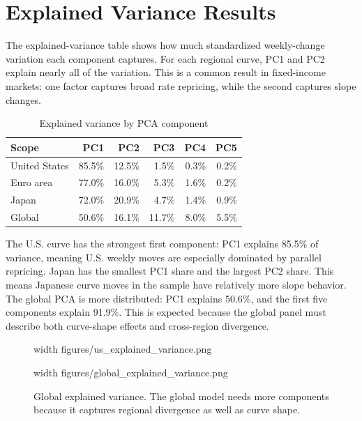 \documentclass[11pt]{article}
\newcommand{\img}[2]{\pdfximage width #1 {#2}\pdfrefximage\pdflastximage}
\begin{document}
\section{Explained Variance Results}

The explained-variance table shows how much standardized weekly-change variation each component captures. For each regional curve, PC1 and PC2 explain nearly all of the variation. This is a common result in fixed-income markets: one factor captures broad rate repricing, while the second captures slope changes.

\begin{table}[htbp]
\centering
\caption{Explained variance by PCA component}
\small
\begin{tabular}{lrrrrr}
\toprule
Scope & PC1 & PC2 & PC3 & PC4 & PC5 \\
\midrule
United States & 85.5\% & 12.5\% & 1.5\% & 0.3\% & 0.2\% \\
Euro area & 77.0\% & 16.0\% & 5.3\% & 1.6\% & 0.2\% \\
Japan & 72.0\% & 20.9\% & 4.7\% & 1.4\% & 0.9\% \\
Global & 50.6\% & 16.1\% & 11.7\% & 8.0\% & 5.5\% \\
\bottomrule
\end{tabular}
\end{table}

The U.S. curve has the strongest first component: PC1 explains 85.5\% of variance, meaning U.S. weekly moves are especially dominated by parallel repricing. Japan has the smallest PC1 share and the largest PC2 share. This means Japanese curve moves in the sample have relatively more slope behavior. The global PCA is more distributed: PC1 explains 50.6\%, and the first five components explain 91.9\%. This is expected because the global panel must describe both curve-shape effects and cross-region divergence.

\begin{figure}[htbp]
\centering
\begin{minipage}{0.49\linewidth}
\centering
\img{\linewidth}{figures/us_explained_variance.png}
\caption{U.S. explained variance. PC1 dominates, with PC2 capturing most of the remaining shape risk.}
\end{minipage}
\hfill
\begin{minipage}{0.49\linewidth}
\centering
\img{\linewidth}{figures/global_explained_variance.png}
\caption{Global explained variance. The global model needs more components because it captures regional divergence as well as curve shape.}
\end{minipage}
\end{figure}
\end{document}
